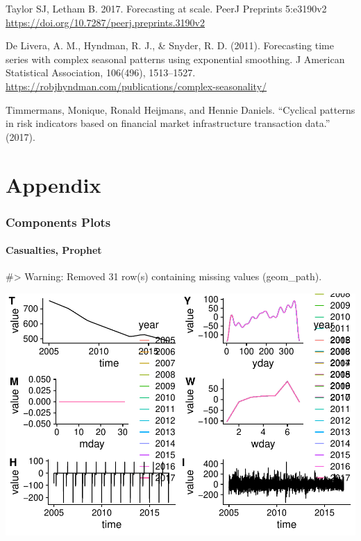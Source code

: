 Taylor SJ, Letham B. 2017. Forecasting at scale. PeerJ Preprints
5:e3190v2 \url{https://doi.org/10.7287/peerj.preprints.3190v2}

De Livera, A. M., Hyndman, R. J., \& Snyder, R. D. (2011). Forecasting
time series with complex seasonal patterns using exponential smoothing.
J American Statistical Association, 106(496), 1513--1527.
\url{https://robjhyndman.com/publications/complex-seasonality/}

Timmermans, Monique, Ronald Heijmans, and Hennie Daniels. ``Cyclical
patterns in risk indicators based on financial market infrastructure
transaction data.'' (2017).

\hypertarget{appendix}{%
\section{Appendix}\label{appendix}}

\hypertarget{components-plots}{%
\subsubsection{Components Plots}\label{components-plots}}

\hypertarget{casualties-prophet}{%
\paragraph{Casualties, Prophet}\label{casualties-prophet}}

\begin{Schunk}
\begin{Soutput}
#> Warning: Removed 31 row(s) containing missing values (geom_path).
\end{Soutput}

\includegraphics[width=1\linewidth]{overview_files/figure-latex/unnamed-chunk-5-1} \end{Schunk}

